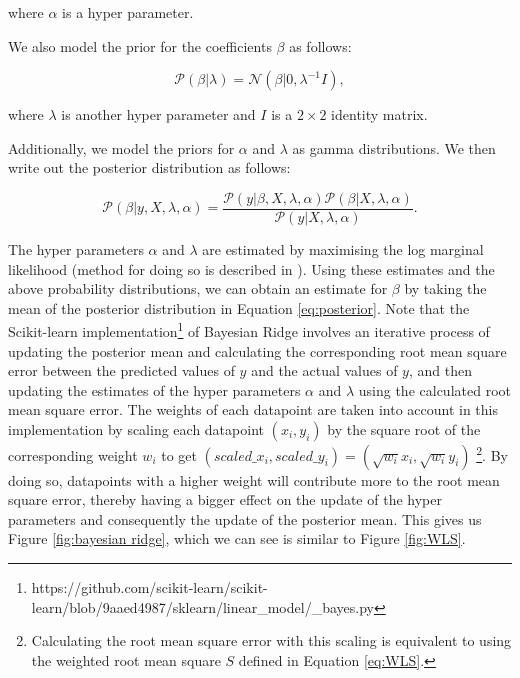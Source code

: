 \documentclass[11pt]{article}
\begin{document}
where $\alpha$ is a hyper parameter.

We also model the prior for the coefficients $\beta$ as follows:

\begin{equation}
	\label{eq:prior}
    \mathcal{P}(\beta | \lambda) = \mathcal{N}(\beta | 0, \lambda^{-1}I),
\end{equation}

where $\lambda$ is another hyper parameter and $I$ is a $2\times2$ identity matrix.

Additionally, we model the priors for $\alpha$ and $\lambda$ as gamma distributions. We then write out the posterior distribution as follows:

\begin{equation}
	\label{eq:posterior}
    \mathcal{P}(\beta | y,X,\lambda,\alpha) = \frac{\mathcal{P}(y | \beta, X, \lambda, \alpha)\mathcal{P}(\beta | X, \lambda, \alpha)}{\mathcal{P}(y | X, \lambda, \alpha)}.
\end{equation}

The hyper parameters $\alpha$ and $\lambda$ are estimated by maximising the log marginal likelihood (method for doing so is described in \cite{tipping2001sparse}). Using these estimates and the above probability distributions, we can obtain an estimate for $\beta$ by taking the mean of the posterior distribution in Equation \ref{eq:posterior}. Note that the Scikit-learn implementation\footnote{https://github.com/scikit-learn/scikit-learn/blob/9aaed4987/sklearn/linear\_model/\_bayes.py} of Bayesian Ridge involves an iterative process of updating the posterior mean and calculating the corresponding root mean square error between the predicted values of $y$ and the actual values of $y$, and then updating the estimates of the hyper parameters $\alpha$ and $\lambda$ using the calculated root mean square error. The weights of each datapoint are taken into account in this implementation by scaling each datapoint $(x_{i}, y_{i})$ by the square root of the corresponding weight $w_{i}$ to get $(scaled\_x_{i}, scaled\_y_{i}) = (\sqrt{w_{i}} x_{i}, \sqrt{w_{i}} y_{i})$ \footnote{Calculating the root mean square error with this scaling is equivalent to using the weighted root mean square $S$ defined in Equation \ref{eq:WLS}.}. By doing so, datapoints with a higher weight will contribute more to the root mean square error, thereby having a bigger effect on the update of the hyper parameters and consequently the update of the posterior mean. This gives us Figure \ref{fig:bayesian ridge}, which we can see is similar to Figure \ref{fig:WLS}.
\end{document}
